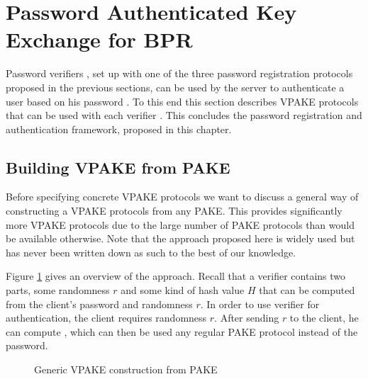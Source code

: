 \section{Password Authenticated Key Exchange for BPR}\label{sec:pake}

Password verifiers \ver, set up with one of the three password registration protocols proposed in the previous sections, can be used by the server to authenticate a user based on his password \pwd.
To this end this section describes \ac{VPAKE} protocols that can be used with each verifier \ver.
This concludes the password registration and authentication framework, proposed in this chapter.


\subsection{Building VPAKE from PAKE}
Before specifying concrete \ac{VPAKE} protocols we want to discuss a general way of constructing a \ac{VPAKE} protocols from any \ac{PAKE}.
This provides significantly more \ac{VPAKE} protocols due to the large number of \ac{PAKE} protocols than would be available otherwise.
Note that the approach proposed here is widely used but has never been written down as such to the best of our knowledge.

Figure \ref{fig:genericVPAKE} gives an overview of the approach.
Recall that a verifier \ver contains two parts, some randomness $r$ and some kind of hash value $H$ that can be computed from the client's password \pwd and randomness $r$.
In order to use verifier \ver for authentication, the client requires randomness $r$.
After sending $r$ to the client, he can compute \ver, which can then be used any regular \ac{PAKE} protocol instead of the password.

\begin{figure}[htbp]
\centering
{}
\caption{Generic VPAKE construction from PAKE}
\label{fig:genericVPAKE}
\end{figure}

